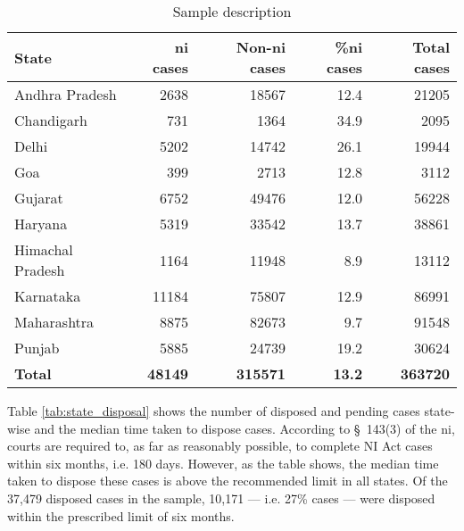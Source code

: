 {\footnotesize \begin{longtable}{@{}lrrr|r@{}}
\caption{Sample description}
\label{tab:sample_desc}\\
\toprule
\textbf{State} & \textbf{\gls{ni} cases} & \textbf{Non-\gls{ni} cases} & \textbf{\%\gls{ni} cases} & \textbf{Total cases}\\ \midrule
\endhead
Andhra Pradesh & 2638 & 18567 & 12.4 & 21205\\
Chandigarh & 731 & 1364 & 34.9 & 2095\\
Delhi & 5202 & 14742 & 26.1 & 19944\\
Goa & 399 & 2713 & 12.8 & 3112\\
Gujarat & 6752 & 49476 & 12.0 & 56228\\
Haryana & 5319 & 33542 & 13.7 & 38861\\
Himachal Pradesh & 1164 & 11948 & 8.9 & 13112\\
Karnataka & 11184 & 75807 & 12.9 & 86991\\
Maharashtra & 8875 & 82673 & 9.7 & 91548\\
Punjab & 5885 & 24739 & 19.2 & 30624\\
\midrule
\textbf{Total} & \textbf{48149} & \textbf{315571} & \textbf{13.2} & \textbf{363720}\\ \bottomrule
\end{longtable}
}

Table \ref{tab:state_disposal} shows the number of disposed and pending cases state-wise and the median time taken to dispose cases. According to \S~143(3) of the \gls{ni}, courts are required to, as far as reasonably possible, to complete NI Act cases within six months, i.e. 180 days. However, as the table shows, the median time taken to dispose these cases is above the recommended limit in all states. Of the 37,479 disposed cases in the sample, 10,171 --- i.e. 27\% cases --- were disposed within the prescribed limit of six months.

